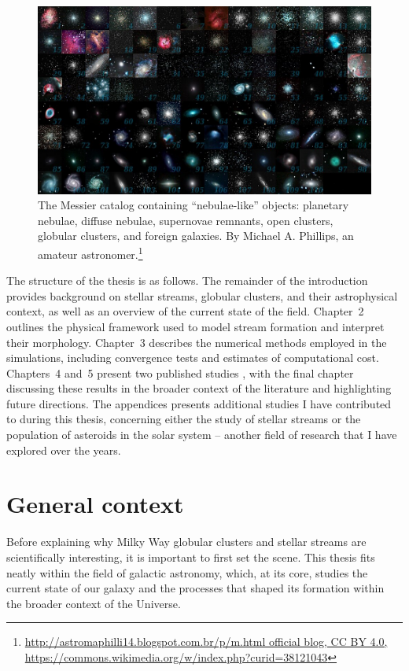 \begin{figure}
    \centering
    \includegraphics[width=\linewidth]{images/All_messier_objects.jpg}
    \caption[Messier objects]{The Messier catalog containing ``nebulae-like'' objects: planetary nebulae, diffuse nebulae, supernovae remnants, open clusters, globular clusters, and foreign galaxies. By Michael A. Phillips, an amateur astronomer.\footnote{\url{http://astromaphilli14.blogspot.com.br/p/m.html official blog, CC BY 4.0, https://commons.wikimedia.org/w/index.php?curid=38121043}}}
    \label{fig:All_messier_objects}
\end{figure}

The structure of the thesis is as follows. The remainder of the introduction provides background on stellar streams, globular clusters, and their astrophysical context, as well as an overview of the current state of the field. Chapter~2 outlines the physical framework used to model stream formation and interpret their morphology. Chapter~3 describes the numerical methods employed in the simulations, including convergence tests and estimates of computational cost. Chapters~4 and~5 present two published studies \citep{2023A&A...676A...5F,2025A&A...699A.289F}, with the final chapter discussing these results in the broader context of the literature and highlighting future directions. The appendices presents additional studies I have contributed to during this thesis, concerning either the study of stellar streams or the population of asteroids in the solar system --  another field of research that I have explored over the years. 

\section{General context}
    Before explaining why Milky Way globular clusters and stellar streams are scientifically interesting, it is important to first set the scene. This thesis fits neatly within the field of galactic astronomy, which, at its core, studies the current state of our galaxy and the processes that shaped its formation within the broader context of the Universe.

